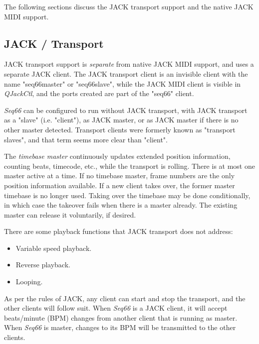 %

   The following sections discuss the JACK transport support and the native
   JACK MIDI support.

\subsection{JACK / Transport}
\label{subsec:jack_transport}

   JACK transport support is \textsl{separate} from native JACK MIDI support,
   and uses a separate JACK client.
   The JACK transport client is an invisible client with the
   name "seq66master" or "seq66slave", while the JACK MIDI client is visible in
   \textsl{QJackCtl}, and the ports created are part of the
   "seq66" client.

   \textsl{Seq66} can be configured to run without JACK transport, with JACK
   transport as a "slave" (i.e. "client"), as JACK master, or as JACK master if
   there is no other master detected.
   Transport clients were formerly known as "transport slaves", and that
   term seems more clear than "client".

   The \textsl{timebase master}
   continuously updates extended position information, counting beats,
   timecode, etc., while the transport is rolling.
   There is at most one master active at a time. If no
   timebase master, frame numbers are the only position information available.
   If a new client takes over, the former master timebase is no longer used.
   Taking over the timebase may be done conditionally, in which case the takeover
   fails when there is a master already. The existing master can release it
   voluntarily, if desired.

   There are some playback functions that JACK transport does not address:

   \begin{itemize}
      \item Variable speed playback.
      \item Reverse playback.
      \item Looping.
   \end{itemize}

   As per the rules of JACK, any client can start and stop the transport, and
   the other clients will follow suit.  When \textsl{Seq66} is a JACK client,
   it will accept beats/minute (BPM) changes from another client that is
   running as master.  When \textsl{Seq66} is master, changes to its BPM will
   be transmitted to the other clients.

